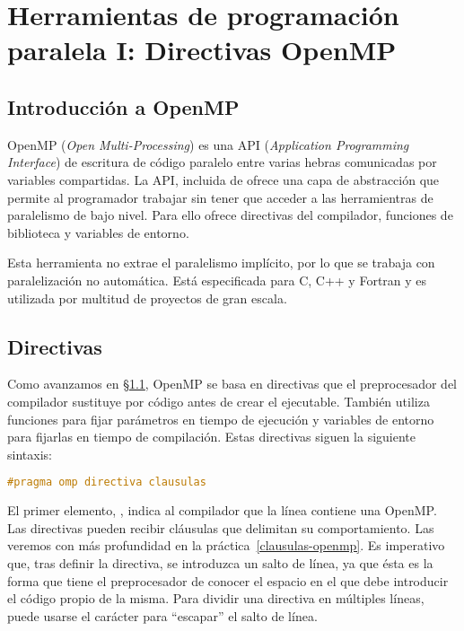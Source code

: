 \chapter{Herramientas de programación paralela I\@: Directivas OpenMP}\label{directivas-openmp}

\section{Introducción a OpenMP}\label{directivas-openmp-introduccion}

OpenMP (\textit{Open Multi-Processing}) es una API (\textit{Application Programming Interface}) de escritura de código paralelo entre varias hebras comunicadas por variables compartidas.
La API, incluida de  ofrece una capa de abstracción que permite al programador trabajar sin tener que acceder a las herramientras de paralelismo de bajo nivel.
Para ello ofrece directivas del compilador, funciones de biblioteca y variables de entorno.

Esta herramienta no extrae el paralelismo implícito, por lo que se trabaja con paralelización no automática.
Está especificada para C, C++ y Fortran y es utilizada por multitud de proyectos de gran escala.

\section{Directivas}\label{directivas-openmp-directivas}

Como avanzamos en \S\ref{directivas-openmp-introduccion}, OpenMP se basa en directivas que el preprocesador del compilador sustituye por código antes de crear el ejecutable.
También utiliza funciones para fijar parámetros en tiempo de ejecución y variables de entorno para fijarlas en tiempo de compilación.
Estas directivas siguen la siguiente sintaxis:

\begin{lstlisting}[language=C]
#pragma omp directiva clausulas
\end{lstlisting}

El primer elemento, , indica al compilador que la línea contiene una  OpenMP\@.
Las directivas pueden recibir cláusulas que delimitan su comportamiento.
Las veremos con más profundidad en la práctica~\ref{clausulas-openmp}.
Es imperativo que, tras definir la directiva, se introduzca un salto de línea, ya que ésta es la forma que tiene el preprocesador de conocer el espacio en el que debe introducir el código propio de la misma.
Para dividir una directiva en múltiples líneas, puede usarse el carácter \code{\textbackslash} para ``escapar'' el salto de línea.


